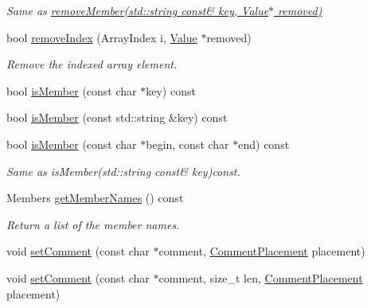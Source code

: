 \begin{DoxyCompactItemize}
\begin{DoxyCompactList}\small\item\em Same as \hyperlink{class_json_1_1_value_a3749dae413a73eac05b7f8dc6deeb6a2}{remove\+Member(std\+::string const\& key, Value$\ast$ removed)} \end{DoxyCompactList}\item 
bool \hyperlink{class_json_1_1_value_ae9e67e08a85a2f3be3396ec0f4c47f65}{remove\+Index} (Array\+Index i, \hyperlink{class_json_1_1_value}{Value} $\ast$removed)
\begin{DoxyCompactList}\small\item\em Remove the indexed array element. \end{DoxyCompactList}\item 
bool \hyperlink{class_json_1_1_value_a196defba501d70ea2b6793afb04108e3}{is\+Member} (const char $\ast$key) const 
\item 
bool \hyperlink{class_json_1_1_value_af728b5738aaa133f3aad2e39dc4f415e}{is\+Member} (const std\+::string \&key) const 
\item 
\hypertarget{class_json_1_1_value_a077604b87a79d75543a1b5438eb9d8ab}{}bool \hyperlink{class_json_1_1_value_a077604b87a79d75543a1b5438eb9d8ab}{is\+Member} (const char $\ast$begin, const char $\ast$end) const \label{class_json_1_1_value_a077604b87a79d75543a1b5438eb9d8ab}

\begin{DoxyCompactList}\small\item\em Same as is\+Member(std\+::string const\& key)const. \end{DoxyCompactList}\item 
Members \hyperlink{class_json_1_1_value_a30fa08af88f2d0a038b22ba9f4e88b2a}{get\+Member\+Names} () const 
\begin{DoxyCompactList}\small\item\em Return a list of the member names. \end{DoxyCompactList}\item 
void \hyperlink{class_json_1_1_value_a29f3a30f7e5d3af6f38d57999bf5b480}{set\+Comment} (const char $\ast$comment, \hyperlink{namespace_json_a4fc417c23905b2ae9e2c47d197a45351}{Comment\+Placement} placement)
\item 
\hypertarget{class_json_1_1_value_a2900152a2887b410a9ddabe278b9d492}{}void \hyperlink{class_json_1_1_value_a2900152a2887b410a9ddabe278b9d492}{set\+Comment} (const char $\ast$comment, size\+\_\+t len, \hyperlink{namespace_json_a4fc417c23905b2ae9e2c47d197a45351}{Comment\+Placement} placement)\label{class_json_1_1_value_a2900152a2887b410a9ddabe278b9d492}


\end{DoxyCompactItemize}
